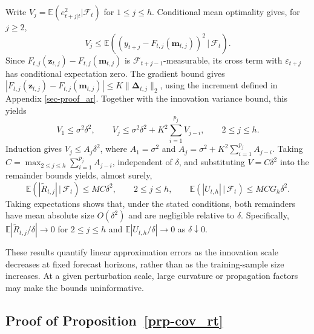 \documentclass[
  american,
  12pt]{article}
\theoremstyle{plain}
\theoremstyle{plain}
\theoremstyle{remark}
\begin{document}
Write \(V_j=\mathbb E(e_{t+j|t}^2|\mathcal F_t)\) for \(1\leq j\leq h\).
Conditional mean optimality gives, for \(j\geq2\), \[
V_j\leq\mathbb E\!\left((y_{t+j}-F_{t,j}(\bm m_{t,j}))^2\,|\,\mathcal F_t\right).
\] Since \(F_{t,j}(\bm z_{t,j})-F_{t,j}(\bm m_{t,j})\) is
\(\mathcal F_{t+j-1}\)-measurable, its cross term with
\(\varepsilon_{t+j}\) has conditional expectation zero. The gradient
bound gives
\(|F_{t,j}(\bm z_{t,j})-F_{t,j}(\bm m_{t,j})|\leq K\|\bm\Delta_{t,j}\|_2\),
using the increment defined in Appendix \ref{sec-proof_ar}. Together
with the innovation variance bound, this yields \[
V_1\leq\sigma^2\delta^2,\qquad
V_j\leq\sigma^2\delta^2+K^2\sum_{i=1}^{p_j}V_{j-i},\qquad 2\leq j\leq h.
\] Induction gives \(V_j\leq A_j\delta^2\), where \(A_1=\sigma^2\) and
\(A_j=\sigma^2+K^2\sum_{i=1}^{p_j}A_{j-i}\). Taking
\(C=\max_{2\leq j\leq h}\sum_{i=1}^{p_j}A_{j-i}\), independent of
\(\delta\), and substituting \(V=C\delta^2\) into the remainder bounds
yields, almost surely, \[
\mathbb E(|\widetilde R_{t,j}|\,|\,\mathcal F_t)\leq MC\delta^2,\qquad 2\leq j\leq h,
\qquad
\mathbb E(|U_{t,h}|\,|\,\mathcal F_t)\leq MCG_h\delta^2.
\] Taking expectations shows that, under the stated conditions, both
remainders have mean absolute size \(O(\delta^2)\) and are negligible
relative to \(\delta\). Specifically,
\(\mathbb E|\widetilde R_{t,j}/\delta|\to0\) for \(2\leq j\leq h\) and
\(\mathbb E|U_{t,h}/\delta|\to0\) as \(\delta\downarrow0\).

These results quantify linear approximation errors as the innovation
scale decreases at fixed forecast horizons, rather than as the
training-sample size increases. At a given perturbation scale, large
curvature or propagation factors may make the bounds uninformative.

\subsection{\texorpdfstring{Proof of
Proposition~\ref{prp-cov_rt}}{Proof of Proposition~}}\label{sec-proof_cov_rt}
\end{document}
